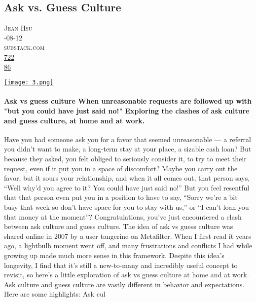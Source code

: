 \documentclass[10pt,a4paper]{article}
\begin{document}
\subsection{Ask vs. Guess Culture}
\noindent\begin{minipage}[t]{0.20\linewidth}
\vspace{0pt}
\noindent\textsc{\footnotesize
{\scriptsize\faUser}\space 
Jean Hsu \\
{\scriptsize\faCalendar}-08-12 \\
{\scriptsize\faGlobe}\space 
substack.com \\
{\scriptsize\faThumbsOUp}\space 
\href{http://news.ycombinator.com/item?id=37176703\&utm\_term=comment}{722} \\
{\scriptsize\faComments}\space 
\href{http://news.ycombinator.com/item?id=37176703\&utm\_term=comment}{86} \\
}
\end{minipage} %
\begin{minipage}[t]{0.80\linewidth}
\vspace{0pt}
\begin{multicols}{2}

    \href{https://jeanhsu.substack.com/p/ask-vs-guess-culture?utm\_source=hackernewsletter\&utm\_medium=email\&utm\_term=fav}{
        \texttt{[image: 3.png]}
    }
  
\paragraph{Ask vs guess culture
When unreasonable requests are followed up with "but you could have just said no!" Exploring the clashes of ask culture and guess culture, at home and at work.}

Have you had someone ask you for a favor that seemed unreasonable — a referral you didn’t want to make, a long-term stay at your place, a sizable cash loan? But because they asked, you felt obliged to seriously consider it, to try to meet their request, even if it put you in a space of discomfort? Maybe you carry out the favor, but it sours your relationship, and when it all comes out, that person says, “Well why’d you agree to it? You could have just said no!”
But you feel resentful that that person even put you in a position to have to say, “Sorry we’re a bit busy that week so don’t have space for you to stay with us,” or “I can’t loan you that money at the moment”?
Congratulations, you’ve just encountered a clash between ask culture and guess culture.
The idea of ask vs guess culture was shared online in 2007 by a user tangerine on Metafilter. When I first read it years ago, a lightbulb moment went off, and many frustrations and conflicts I had while growing up made much more sense in this framework.
Despite this idea’s longevity, I find that it’s still a new-to-many and incredibly useful concept to revisit, so here’s a little exploration of ask vs guess culture at home and at work.
Ask culture and guess culture are vastly different in behavior and expectations. Here are some highlights:
Ask cul

\end{multicols}
\end{minipage}
\end{document}
